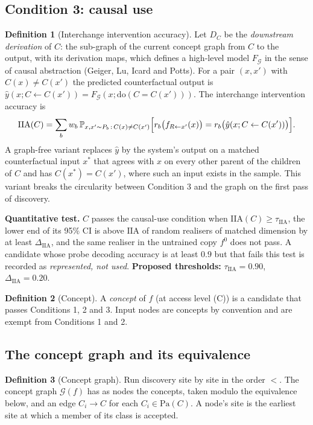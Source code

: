\documentclass[11pt]{article}
\theoremstyle{definition}
\newtheorem{definition}{Definition}[section]
\theoremstyle{plain}
\theoremstyle{remark}
\renewcommand{\Pr}{\mathbb{P}}
\newcommand{\pa}{\mathrm{Pa}}
\newcommand{\G}{\mathcal{G}}
\newcommand{\IIA}{\mathrm{IIA}}
\begin{document}
\subsection{Condition 3: causal use}

\begin{definition}[Interchange intervention accuracy]\label{def:iia}
Let $D_C$ be the \emph{downstream derivation} of $C$: the sub-graph of the
current concept graph from $C$ to the output, with its derivation maps, which
defines a high-level model $F_{\G}$ in the sense of causal abstraction
(Geiger, Lu, Icard and Potts). For a pair $(x,x')$ with $C(x)\neq C(x')$ the
predicted counterfactual output is $\hat y(x;C\leftarrow C(x'))=F_{\G}(x;
\mathrm{do}(C=C(x')))$. The interchange intervention accuracy is
\[
\IIA(C)=\sum_b w_b\,\Pr_{x,x'\sim P_b\,:\,C(x)\ne C(x')}
\Bigl[r_b\bigl(f_{R\leftarrow x'}(x)\bigr)=r_b\bigl(\hat y(x;C\leftarrow C(x'))\bigr)\Bigr].
\]
A graph-free variant replaces $\hat y$ by the system's output on a matched
counterfactual input $x^\ast$ that agrees with $x$ on every other parent of the
children of $C$ and has $C(x^\ast)=C(x')$, where such an input exists in the
sample. This variant breaks the circularity between Condition 3 and the graph
on the first pass of discovery.
\end{definition}

\noindent\textbf{Quantitative test.} $C$ passes the causal-use condition when
$\IIA(C)\ge\tau_{\IIA}$, the lower end of its 95\% CI is above
$\IIA$ of random realisers of matched dimension by at least $\Delta_{\IIA}$,
and the same realiser in the untrained copy $f^0$ does not pass. A candidate
whose probe decoding accuracy is at least $0.9$ but that fails this test is
recorded as \emph{represented, not used}.
\textbf{Proposed thresholds:} $\tau_{\IIA}=0.90$, $\Delta_{\IIA}=0.20$.

\begin{definition}[Concept]\label{def:concept}
A \emph{concept} of $f$ (at access level (C)) is a candidate that passes
Conditions 1, 2 and 3. Input nodes are concepts by convention and are exempt
from Conditions 1 and 2.
\end{definition}

\subsection{The concept graph and its equivalence}

\begin{definition}[Concept graph]\label{def:graph}
Run discovery site by site in the order $<$. The concept graph $\G(f)$ has as
nodes the concepts, taken modulo the equivalence below, and an edge
$C_i\to C$ for each $C_i\in\pa(C)$. A node's site is the earliest site at
which a member of its class is accepted.
\end{definition}
\end{document}
